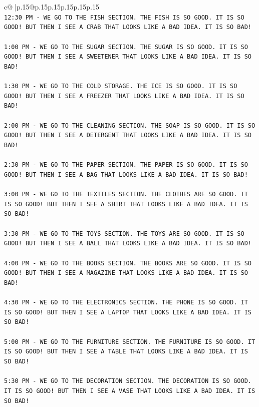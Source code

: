 \documentclass{article}
\begin{document}
{\begin{supertabular}{c@{$\;$}|p{.15\linewidth}@{}p{.15\linewidth}p{.15\linewidth}p{.15\linewidth}p{.15\linewidth}p{.15\linewidth}}
{{{\\ 
\texttt{12:30 PM {-} WE GO TO THE FISH SECTION. THE FISH IS SO GOOD. IT IS SO GOOD! BUT THEN I SEE A CRAB THAT LOOKS LIKE A BAD IDEA. IT IS SO BAD!} \\
\\ 
\texttt{1:00 PM {-} WE GO TO THE SUGAR SECTION. THE SUGAR IS SO GOOD. IT IS SO GOOD! BUT THEN I SEE A SWEETENER THAT LOOKS LIKE A BAD IDEA. IT IS SO BAD!} \\
\\ 
\texttt{1:30 PM {-} WE GO TO THE COLD STORAGE. THE ICE IS SO GOOD. IT IS SO GOOD! BUT THEN I SEE A FREEZER THAT LOOKS LIKE A BAD IDEA. IT IS SO BAD!} \\
\\ 
\texttt{2:00 PM {-} WE GO TO THE CLEANING SECTION. THE SOAP IS SO GOOD. IT IS SO GOOD! BUT THEN I SEE A DETERGENT THAT LOOKS LIKE A BAD IDEA. IT IS SO BAD!} \\
\\ 
\texttt{2:30 PM {-} WE GO TO THE PAPER SECTION. THE PAPER IS SO GOOD. IT IS SO GOOD! BUT THEN I SEE A BAG THAT LOOKS LIKE A BAD IDEA. IT IS SO BAD!} \\
\\ 
\texttt{3:00 PM {-} WE GO TO THE TEXTILES SECTION. THE CLOTHES ARE SO GOOD. IT IS SO GOOD! BUT THEN I SEE A SHIRT THAT LOOKS LIKE A BAD IDEA. IT IS SO BAD!} \\
\\ 
\texttt{3:30 PM {-} WE GO TO THE TOYS SECTION. THE TOYS ARE SO GOOD. IT IS SO GOOD! BUT THEN I SEE A BALL THAT LOOKS LIKE A BAD IDEA. IT IS SO BAD!} \\
\\ 
\texttt{4:00 PM {-} WE GO TO THE BOOKS SECTION. THE BOOKS ARE SO GOOD. IT IS SO GOOD! BUT THEN I SEE A MAGAZINE THAT LOOKS LIKE A BAD IDEA. IT IS SO BAD!} \\
\\ 
\texttt{4:30 PM {-} WE GO TO THE ELECTRONICS SECTION. THE PHONE IS SO GOOD. IT IS SO GOOD! BUT THEN I SEE A LAPTOP THAT LOOKS LIKE A BAD IDEA. IT IS SO BAD!} \\
\\ 
\texttt{5:00 PM {-} WE GO TO THE FURNITURE SECTION. THE FURNITURE IS SO GOOD. IT IS SO GOOD! BUT THEN I SEE A TABLE THAT LOOKS LIKE A BAD IDEA. IT IS SO BAD!} \\
\\ 
\texttt{5:30 PM {-} WE GO TO THE DECORATION SECTION. THE DECORATION IS SO GOOD. IT IS SO GOOD! BUT THEN I SEE A VASE THAT LOOKS LIKE A BAD IDEA. IT IS SO BAD!} \\
}}}
\end{supertabular}}
\end{document}
